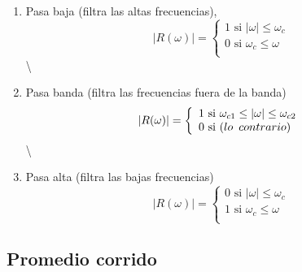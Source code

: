 \documentclass[
]{agujournal2019}
\providecommand{\tightlist}{%
  \setlength{\itemsep}{0pt}\setlength{\parskip}{0pt}}\usepackage{longtable,booktabs,array}
\begin{document}
\begin{enumerate}
\def\labelenumi{(\arabic{enumi})}
\tightlist
\item
  Pasa baja (filtra las altas frecuencias), \begin{equation*}
  |R(\omega)|=
    \left
    \lbrace
    \begin{array}{l}
   1 \text{ si } |\omega| \le \omega_c \\
   0 \text{ si } \omega_c \le \omega   \\
    \end{array}
    \right.
    \end{equation*} \textbackslash{}
\item
  Pasa banda (filtra las frecuencias fuera de la banda)
  \begin{equation*}
  |R(\omega)|=\left\lbrace
    \begin{array}{l}
   1 \text{ si } \omega_{c1}\le|\omega|\le \omega_{c2} \\
   0 \text{ si } \text({ lo}\,\,\,{ contrario}) \\
    \end{array}
    \right.
    \end{equation*} \textbackslash{}
\item
  Pasa alta (filtra las bajas frecuencias) \begin{equation*}
  |R(\omega)|=\left\lbrace
    \begin{array}{l}
   0 \text{ si } |\omega|\le \omega_c \\
   1 \text{ si } \omega_c\le\omega \\
    \end{array}
    \right.
    \end{equation*}
\end{enumerate}

\begin{center}
\end{center}

\subsection{Promedio corrido}\label{promedio-corrido}
\end{document}
